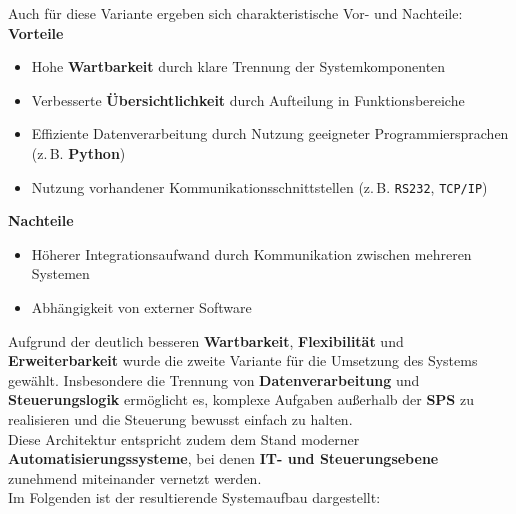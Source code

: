 Auch für diese Variante ergeben sich charakteristische Vor- und Nachteile:\\

\textbf{Vorteile}
\begin{itemize}
	\item Hohe \textbf{Wartbarkeit} durch klare Trennung der Systemkomponenten
	\item Verbesserte \textbf{Übersichtlichkeit} durch Aufteilung in Funktionsbereiche
	\item Effiziente Datenverarbeitung durch Nutzung geeigneter Programmiersprachen (z.\,B. \textbf{Python})
	\item Nutzung vorhandener Kommunikationsschnittstellen (z.\,B. \texttt{RS232}, \texttt{TCP/IP})
\end{itemize}

\textbf{Nachteile}
\begin{itemize}
	\item Höherer Integrationsaufwand durch Kommunikation zwischen mehreren Systemen
	\item Abhängigkeit von externer Software
\end{itemize}

Aufgrund der deutlich besseren \textbf{Wartbarkeit}, \textbf{Flexibilität} und \textbf{Erweiterbarkeit} wurde die zweite Variante für die Umsetzung des Systems gewählt. 
Insbesondere die Trennung von \textbf{Datenverarbeitung} und \textbf{Steuerungslogik} ermöglicht es, komplexe Aufgaben außerhalb der \textbf{SPS} zu realisieren und die Steuerung bewusst einfach zu halten.\\

Diese Architektur entspricht zudem dem Stand moderner \textbf{Automatisierungssysteme}, bei denen \textbf{IT- und Steuerungsebene} zunehmend miteinander vernetzt werden.\\

Im Folgenden ist der resultierende Systemaufbau dargestellt:

